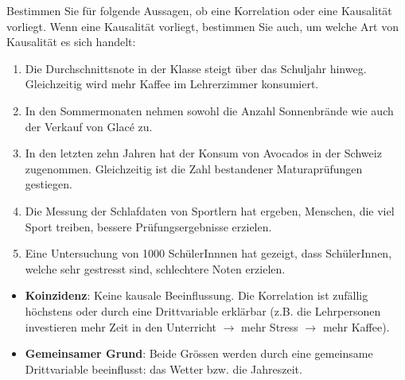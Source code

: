 \begin{myexercise}
    Bestimmen Sie für folgende Aussagen, ob eine Korrelation oder eine Kausalität vorliegt. Wenn eine Kausalität vorliegt, bestimmen Sie auch, um welche Art von Kausalität es sich handelt:

    \begin{enumerate}
        \item Die Durchschnittsnote in der Klasse steigt über das Schuljahr hinweg. Gleichzeitig wird mehr Kaffee im Lehrerzimmer konsumiert.
        \item In den Sommermonaten nehmen sowohl die Anzahl Sonnenbrände wie auch der Verkauf von Glacé zu.
        \item In den letzten zehn Jahren hat der Konsum von Avocados in der Schweiz zugenommen. Gleichzeitig ist die Zahl bestandener Maturaprüfungen gestiegen.
        \item Die Messung der Schlafdaten von Sportlern hat ergeben, Menschen, die viel Sport treiben, bessere Prüfungsergebnisse erzielen.
        \item Eine Untersuchung von 1000 SchülerInnnen hat gezeigt, dass SchülerInnen, welche sehr gestresst sind, schlechtere Noten erzielen.
    \end{enumerate}

    \begin{myanswer}
        \begin{itemize}
            \item \textbf{Koinzidenz}: Keine kausale Beeinflussung. Die Korrelation ist zufällig höchstens oder durch eine Drittvariable erklärbar (z.B. die Lehrpersonen investieren mehr Zeit in den Unterricht $\rightarrow$ mehr Stress $\rightarrow$ mehr Kaffee).
                  \begin{center}
                  \end{center}

            \item \textbf{Gemeinsamer Grund}: Beide Grössen werden durch eine gemeinsame Drittvariable beeinflusst: das Wetter bzw. die Jahreszeit.
                  \begin{center}
                  \end{center}


\end{itemize}
\end{myanswer}
\end{myexercise}
